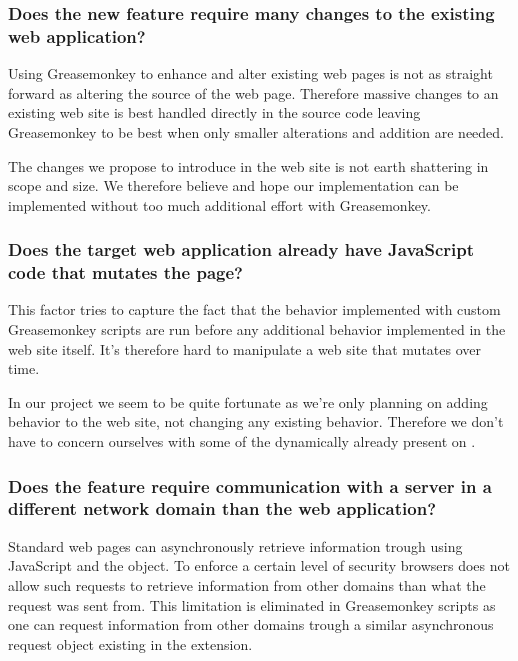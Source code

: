 \subsubsection{Does the new feature require many changes to the existing web
  application?}

Using Greasemonkey to enhance and alter existing web pages is not as straight
forward as altering the source of the web page. Therefore massive changes to
an existing web site is best handled directly in the source code leaving
Greasemonkey to be best when only smaller alterations and addition are needed.

The changes we propose to introduce in the \urort{} web site is not earth
shattering in scope and size. We therefore believe and hope our implementation
can be implemented without too much additional effort with Greasemonkey.

\subsubsection{Does the target web application already have JavaScript code
  that mutates the page?}

This factor tries to capture the fact that the behavior implemented with
custom Greasemonkey scripts are run before any additional behavior
implemented in the web site itself. It's therefore hard to manipulate
a web site that mutates over time.

In our project we seem to be quite fortunate as we're only planning on adding
behavior to the \urort{} web site, not changing any existing behavior.
Therefore we don't have to concern ourselves with some of the dynamically
already present on \urort{}.

\subsubsection{Does the feature require communication with a server in a
  different network domain than the web application?}
\label{section:implementation.architecture,extending.different.domain}

Standard web pages can asynchronously retrieve information trough using
JavaScript and the  object. To enforce a certain
level of security browsers does not allow such requests to retrieve
information from other domains than what the request was sent from.
This limitation is eliminated in Greasemonkey scripts as one can request
information from other domains trough a similar asynchronous request object
existing in the extension.

